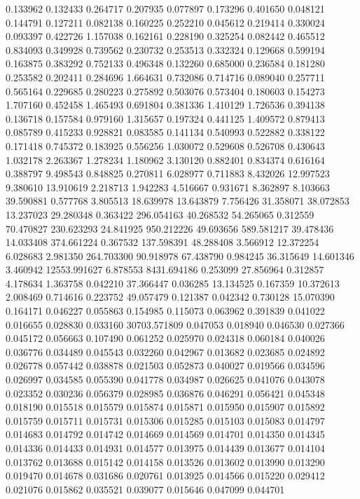 0.133962
0.132433
0.264717
0.207935
0.077897
0.173296
0.401650
0.048121
0.144791
0.127211
0.082138
0.160225
0.252210
0.045612
0.219414
0.330024
0.093397
0.422726
1.157038
0.162161
0.228190
0.325254
0.082442
0.465512
0.834093
0.349928
0.739562
0.230732
0.253513
0.332324
0.129668
0.599194
0.163875
0.383292
0.752133
0.496348
0.132260
0.685000
0.236584
0.181280
0.253582
0.202411
0.284696
1.664631
0.732086
0.714716
0.089040
0.257711
0.565164
0.229685
0.280223
0.275892
0.503076
0.573404
0.180603
0.154273
1.707160
0.452458
1.465493
0.691804
0.381336
1.410129
1.726536
0.394138
0.136718
0.157584
0.979160
1.315657
0.197324
0.441125
1.409572
0.879413
0.085789
0.415233
0.928821
0.083585
0.141134
0.540993
0.522882
0.338122
0.171418
0.745372
0.183925
0.556256
1.030072
0.529608
0.526708
0.430643
1.032178
2.263367
1.278234
1.180962
3.130120
0.882401
0.834374
0.616164
0.388797
9.498543
0.848825
0.270811
6.028977
0.711883
8.432026
12.997523
9.380610
13.910619
2.218713
1.942283
4.516667
0.931671
8.362897
8.103663
39.590881
0.577768
3.805513
18.639978
13.643879
7.756426
31.358071
38.072853
13.237023
29.280348
0.363422
296.054163
40.268532
54.265065
0.312559
70.470827
230.623293
24.841925
950.212226
49.693656
589.581217
39.478436
14.033408
374.661224
0.367532
137.598391
48.288408
3.566912
12.372254
6.028683
2.981350
264.703300
90.918978
67.438790
0.984245
36.315649
14.601346
3.460942
12553.991627
6.878553
8431.694186
0.253099
27.856964
0.312857
4.178634
1.363758
0.042210
37.366447
0.036285
13.134525
0.167359
10.372613
2.008469
0.714616
0.223752
49.057479
0.121387
0.042342
0.730128
15.070390
0.164171
0.046227
0.055863
0.154985
0.115073
0.063962
0.391839
0.041022
0.016655
0.028830
0.033160
30703.571809
0.047053
0.018940
0.046530
0.027366
0.045172
0.056663
0.107490
0.061252
0.025970
0.024318
0.060184
0.040026
0.036776
0.034489
0.045543
0.032260
0.042967
0.013682
0.023685
0.024892
0.026778
0.057442
0.038878
0.021503
0.052873
0.040027
0.019566
0.034596
0.026997
0.034585
0.055390
0.041778
0.034987
0.026625
0.041076
0.043078
0.023352
0.030236
0.056379
0.028985
0.036876
0.046291
0.056421
0.045348
0.018190
0.015518
0.015579
0.015874
0.015871
0.015950
0.015907
0.015892
0.015759
0.015711
0.015731
0.015306
0.015285
0.015103
0.015083
0.014797
0.014683
0.014792
0.014742
0.014669
0.014569
0.014701
0.014350
0.014345
0.014336
0.014433
0.014931
0.014577
0.013975
0.014439
0.013677
0.014104
0.013762
0.013688
0.015142
0.014158
0.013526
0.013602
0.013990
0.013290
0.019470
0.014678
0.031686
0.020761
0.013925
0.014566
0.015220
0.029412
0.021076
0.015862
0.035521
0.039077
0.015646
0.047099
0.044701
